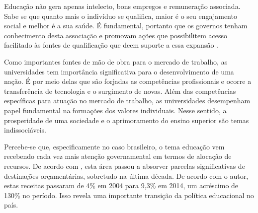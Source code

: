 Educação não gera apenas intelecto, bons empregos e remuneração associada. Sabe se que quanto mais o indivíduo se qualifica, maior é o seu engajamento social e melhor é a sua saúde. É fundamental, portanto que os governos tenham conhecimento desta associação e promovam ações que possibilitem acesso facilitado às fontes de qualificação que deem suporte a essa expansão \cite[p.~45]{OCDE_2017}.


Como importantes fontes de mão de obra para o mercado de trabalho, as universidades tem importância significativa para o desenvolvimento de uma nação. É por meio delas que são forjadas as competências profissionais e ocorre a transferência de tecnologia e o surgimento de novas. Além das competências específicas para atuação no mercado de trabalho, as universidades desempenham papel fundamental na formações dos valores individuais. Nesse sentido, a  prosperidade de uma sociedade e o aprimoramento do ensino superior são temas indissociáveis.


Percebe-se que, especificamente no caso brasileiro, o tema educação vem recebendo cada vez mais atenção governamental em termos de alocação de recursos. De acordo com , esta área passou a absorver parcelas significativas de destinações orçamentárias, sobretudo na última década. De acordo com o autor, estas receitas passaram de 4\% em 2004 para 9,3\% em 2014, um acréscimo de 130\% no período. Isso revela uma importante transição da política educacional no país.


